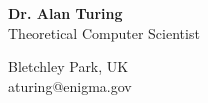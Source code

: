 \documentclass{article}
\begin{document}
\noindent\begin{minipage}{0.6\textwidth}
{\Large \textbf{Dr. Alan Turing}} \\
Theoretical Computer Scientist
\end{minipage}
\begin{minipage}{0.4\textwidth}
\raggedleft
Bletchley Park, UK \\
aturing@enigma.gov
\end{minipage}
\end{document}
